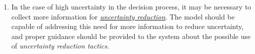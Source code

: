 \documentclass[12pt]{article}
\newcommand{\dan}[1]{\textcolor{blue}{{\it [Dan says: #1]}}}
\begin{document}
\begin{enumerate}[noitemsep]

    
    

    
    
    
    \item In the case of high uncertainty in the decision process, it may be necessary to collect more information for \ul{\em uncertainty reduction}. The model should be capable of addressing this need for more information to reduce uncertainty, and proper guidance should be provided to the system about the possible use of \emph{uncertainty reduction tactics}. 
    

\end{enumerate}
\end{document}
